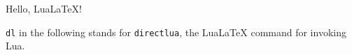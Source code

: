 \documentclass[a4paper,10pt]{report}
\begin{document}
Hello, Lua\LaTeX{}!

\texttt{dl} in the following stands for \texttt{directlua}, the Lua\LaTeX{} command
for invoking Lua.
\end{document}
